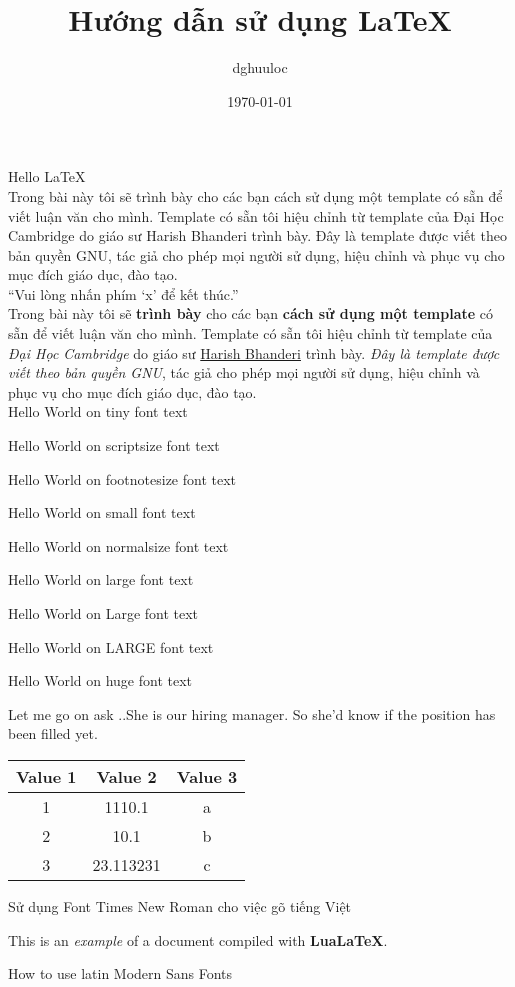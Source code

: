 \documentclass[a4paper, 12pt]{article}
\title{Hướng dẫn sử dụng \LaTeX}
\author{dghuuloc}
\date{\today}
\begin{document}
    \maketitle

    Hello \LaTeX \\

    Trong bài này tôi sẽ trình bày cho các bạn cách sử dụng một template có sẵn để viết luận văn cho mình. 
    Template có sẵn tôi hiệu chỉnh từ template của Đại Học Cambridge do giáo sư Harish Bhanderi trình bày. 
    Đây là template được viết theo bản quyền GNU, tác giả cho phép mọi người sử dụng, 
    hiệu chỉnh và phục vụ cho mục đích giáo dục, đào tạo.\\

    ``Vui lòng nhấn phím `x' để kết thúc.''\\

    Trong bài này tôi sẽ \textbf{trình bày} cho các bạn {\bf cách sử dụng một template} có sẵn để viết luận văn cho mình. 
    Template có sẵn tôi hiệu chỉnh từ template của {\it Đại Học Cambridge} do giáo sư \underline{Harish Bhanderi} trình bày. 
    \emph{Đây là template được viết theo bản quyền GNU}, tác giả cho phép mọi người sử dụng, 
    hiệu chỉnh và phục vụ cho mục đích giáo dục, đào tạo.\\

    {\tiny Hello World on tiny font text}

    {\scriptsize Hello World on scriptsize font text}

    {\footnotesize Hello World on footnotesize font text}

    {\small Hello World on small font text}

    {\normalsize Hello World on normalsize font text}

    {\large Hello World on large font text}

    {\Large Hello World on Large font text}

    {\LARGE Hello World on LARGE font text}

    {\huge Hello World on huge font text} 
    
    Let me go on ask ..She is our hiring manager. So she'd know if the position has been filled yet.\\

    \begin{tabular}{ | c | c | c | }
        \hline
        \textbf{Value 1} & \textbf{Value 2} & \textbf{Value 3}\\
        \hline
        1 & 1110.1 & a\\
        \hline
        2 & 10.1 & b\\
        \hline
        3 & 23.113231 & c\\
        \hline
    \end{tabular}


    \setmainfont{Times New Roman}
    Sử dụng Font Times New Roman cho việc gõ tiếng Việt

    This is an \textit{example} of a document compiled
    with \textbf{LuaLaTeX}.

    \setmainfont{Latin Modern Sans}
    How to use latin Modern Sans Fonts
\end{document}
